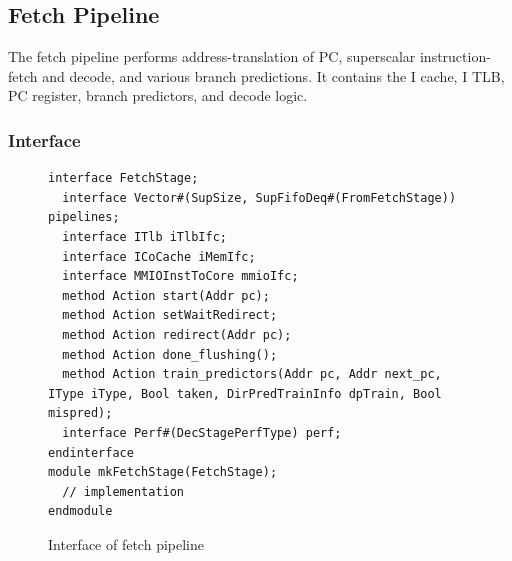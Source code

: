 \subsection{Fetch Pipeline}\label{sec:fetch}

The fetch pipeline performs address-translation of PC, superscalar instruction-fetch and decode, and various branch predictions.
It contains the I cache, I TLB, PC register, branch predictors, and decode logic.

\subsubsection{Interface}

\begin{figure}
\begin{lstlisting}[caption={}]
interface FetchStage;
  interface Vector#(SupSize, SupFifoDeq#(FromFetchStage)) pipelines;
  interface ITlb iTlbIfc;
  interface ICoCache iMemIfc;
  interface MMIOInstToCore mmioIfc;
  method Action start(Addr pc);
  method Action setWaitRedirect;
  method Action redirect(Addr pc);
  method Action done_flushing();
  method Action train_predictors(Addr pc, Addr next_pc, IType iType, Bool taken, DirPredTrainInfo dpTrain, Bool mispred);
  interface Perf#(DecStagePerfType) perf;
endinterface
module mkFetchStage(FetchStage);
  // implementation
endmodule
\end{lstlisting}
\caption{Interface of fetch pipeline}\label{fig:fetch-fic}
\end{figure}

